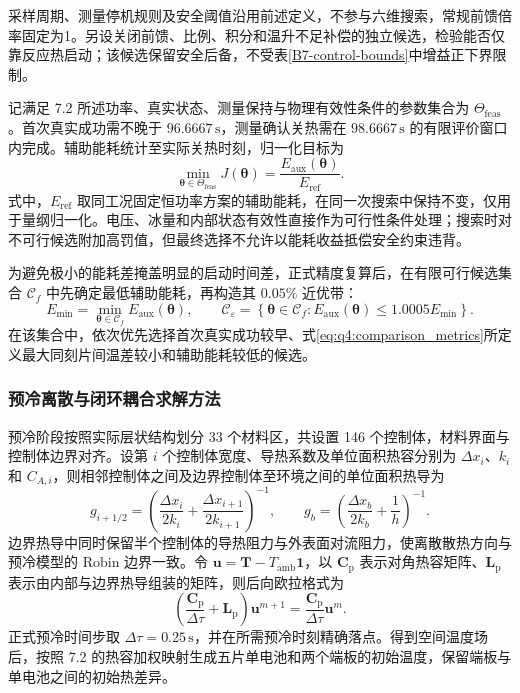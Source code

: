 \documentclass[bwprint]{gmcmthesis}
\numberwithin{equation}{section}
\numberwithin{figure}{section}
\begin{document}
采样周期、测量停机规则及安全阈值沿用前述定义，不参与六维搜索，常规前馈倍率固定为1。另设关闭前馈、比例、积分和温升不足补偿的独立候选，检验能否仅靠反应热启动；该候选保留安全后备，不受表\ref{B7-control-bounds}中增益正下界限制。

记满足 7.2 所述功率、真实状态、测量保持与物理有效性条件的参数集合为 \(\Theta_{\mathrm{feas}}\)。首次真实成功需不晚于 \(96.6667\,\mathrm s\)，测量确认关热需在 \(98.6667\,\mathrm s\) 的有限评价窗口内完成。辅助能耗统计至实际关热时刻，归一化目标为
\begin{equation}
\min_{\boldsymbol{\theta}\in\Theta_{\mathrm{feas}}}
J(\boldsymbol{\theta})
=\frac{E_{\mathrm{aux}}(\boldsymbol{\theta})}{E_{\mathrm{ref}}}.
\label{eq:q4:solver_objective}
\end{equation}
式中，\(E_{\mathrm{ref}}\) 取同工况固定恒功率方案的辅助能耗，在同一次搜索中保持不变，仅用于量纲归一化。电压、冰量和内部状态有效性直接作为可行性条件处理；搜索时对不可行候选附加高罚值，但最终选择不允许以能耗收益抵偿安全约束违背。

为避免极小的能耗差掩盖明显的启动时间差，正式精度复算后，在有限可行候选集合 \(\mathcal C_f\) 中先确定最低辅助能耗，再构造其 \(0.05\%\) 近优带：
\begin{equation}
E_{\min}=\min_{\boldsymbol{\theta}\in\mathcal C_f}E_{\mathrm{aux}}(\boldsymbol{\theta}),\qquad
\mathcal C_{\varepsilon}=\left\{\boldsymbol{\theta}\in\mathcal C_f:
E_{\mathrm{aux}}(\boldsymbol{\theta})\leq1.0005E_{\min}\right\}.
\label{eq:q4:solver_energy_band}
\end{equation}
在该集合中，依次优先选择首次真实成功较早、式\eqref{eq:q4:comparison_metrics}所定义最大同刻片间温差较小和辅助能耗较低的候选。

\subsubsection{预冷离散与闭环耦合求解方法}
预冷阶段按照实际层状结构划分 33 个材料区，共设置 146 个控制体，材料界面与控制体边界对齐。设第 \(i\) 个控制体宽度、导热系数及单位面积热容分别为 \(\Delta x_i\)、\(k_i\) 和 \(C_{A,i}\)，则相邻控制体之间及边界控制体至环境之间的单位面积热导为
\begin{equation}
g_{i+1/2}=\left(\frac{\Delta x_i}{2k_i}+\frac{\Delta x_{i+1}}{2k_{i+1}}\right)^{-1},\qquad
g_b=\left(\frac{\Delta x_b}{2k_b}+\frac{1}{h}\right)^{-1}.
\label{eq:q4:solver_precool_conductance}
\end{equation}
边界热导中同时保留半个控制体的导热阻力与外表面对流阻力，使离散散热方向与预冷模型的 Robin 边界一致。令 \(\boldsymbol{u}=\boldsymbol{T}-T_{\mathrm{amb}}\boldsymbol{1}\)，以 \(\mathbf C_{\mathrm p}\) 表示对角热容矩阵、\(\mathbf L_{\mathrm p}\) 表示由内部与边界热导组装的矩阵，则后向欧拉格式为
\begin{equation}
\left(\frac{\mathbf C_{\mathrm p}}{\Delta\tau}+\mathbf L_{\mathrm p}\right)
\boldsymbol{u}^{m+1}=\frac{\mathbf C_{\mathrm p}}{\Delta\tau}\boldsymbol{u}^{m}.
\label{eq:q4:solver_precool_be}
\end{equation}
正式预冷时间步取 \(\Delta\tau=0.25\,\mathrm s\)，并在所需预冷时刻精确落点。得到空间温度场后，按照 7.2 的热容加权映射生成五片单电池和两个端板的初始温度，保留端板与单电池之间的初始热差异。
\end{document}
